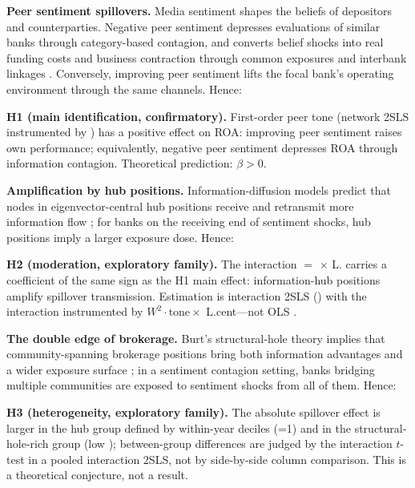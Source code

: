 \textbf{Peer sentiment spillovers.} Media sentiment shapes the
beliefs of depositors and counterparties. Negative peer sentiment
depresses evaluations of similar banks through category-based
contagion, and converts belief shocks into real funding costs and
business contraction through common exposures and interbank linkages
\parencite{fang2024media,jackson2021systemic}. Conversely, improving
peer sentiment lifts the focal bank's operating environment through
the same channels. Hence:

\textbf{H1 (main identification, confirmatory).} First-order peer
tone  (network 2SLS instrumented by
) has a positive effect on ROA:
improving peer sentiment raises own performance; equivalently,
negative peer sentiment depresses ROA through information contagion.
Theoretical prediction: $\beta > 0$.

\textbf{Amplification by hub positions.} Information-diffusion
models predict that nodes in eigenvector-central hub positions
receive and retransmit more information flow
\parencite{bonacich1972factoring,yu2024centrality}; for banks on the
receiving end of sentiment shocks, hub positions imply a larger
exposure dose. Hence:

\textbf{H2 (moderation, exploratory family).} The interaction
 $=$  $\times$
L. carries a coefficient of the same
sign as the H1 main effect: information-hub positions amplify
spillover transmission. Estimation is interaction 2SLS
() with the interaction instrumented by
$W^{2}\cdot\text{tone}\times$ L.cent---not OLS
\parencite{brambor2006understanding}.

\textbf{The double edge of brokerage.} Burt's structural-hole theory
implies that community-spanning brokerage positions bring both
information advantages and a wider exposure surface
\parencite{burt1992structural,burt2004structural}; in a sentiment
contagion setting, banks bridging multiple communities are exposed to
sentiment shocks from all of them. Hence:

\textbf{H3 (heterogeneity, exploratory family).} The absolute
spillover effect is larger in the hub group defined by within-year
deciles (=1) and in the structural-hole-rich
group (low ); between-group differences are
judged by the interaction $t$-test in a pooled interaction 2SLS, not
by side-by-side column comparison. This is a theoretical conjecture,
not a result.

